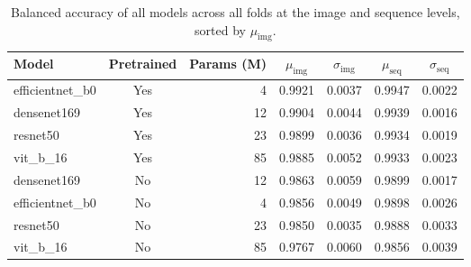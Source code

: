 \begin{table}[H]
\caption{Balanced accuracy of all models across all folds at the image and sequence levels, sorted by $\mu_{\mathrm{img}}$.}
\label{tab:bal_acc}
\begin{tabular}{l c r c c c c}
\toprule
Model & Pretrained & Params (M) & $\mu_{\mathrm{img}}$ & $\sigma_{\mathrm{img}}$ & $\mu_{\mathrm{seq}}$ & $\sigma_{\mathrm{seq}}$ \\
\midrule
efficientnet\_b0 & Yes & 4 & 0.9921 & 0.0037 & 0.9947 & 0.0022 \\
densenet169 & Yes & 12 & 0.9904 & 0.0044 & 0.9939 & 0.0016 \\
resnet50 & Yes & 23 & 0.9899 & 0.0036 & 0.9934 & 0.0019 \\
vit\_b\_16 & Yes & 85 & 0.9885 & 0.0052 & 0.9933 & 0.0023 \\
densenet169 & No & 12 & 0.9863 & 0.0059 & 0.9899 & 0.0017 \\
efficientnet\_b0 & No & 4 & 0.9856 & 0.0049 & 0.9898 & 0.0026 \\
resnet50 & No & 23 & 0.9850 & 0.0035 & 0.9888 & 0.0033 \\
vit\_b\_16 & No & 85 & 0.9767 & 0.0060 & 0.9856 & 0.0039 \\
\bottomrule
\end{tabular}
\end{table}

